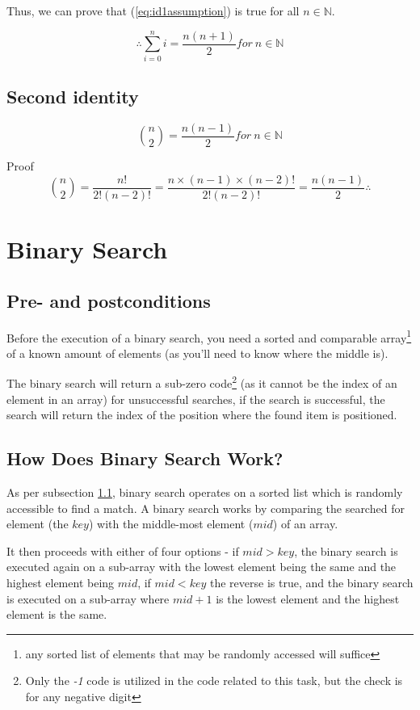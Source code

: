 \documentclass[a4paper,11pt]{article}
\begin{document}
Thus, we can prove that (\ref{eq:id1assumption}) is true for all $n \in \mathbb{N}$.

$$\therefore \sum_{i=0}^n i = \frac{n(n+1)}{2} for\ n \in \mathbb{N}$$

\subsection{Second identity}

$$\binom{n}{2} = \frac{n(n-1)}{2} for\ n \in \mathbb{N}$$

Proof
$$\binom{n}{2} = \frac{n!}{2!(n-2)!} = \frac{n \times (n-1) \times (n-2)!}{2!(n-2)!} = \frac{n(n-1)}{2} \therefore$$

\section{Binary Search}

\subsection{Pre- and postconditions}
\label{subsec:prepostcond}
Before the execution of a binary search, you need a sorted and comparable array\footnote{any sorted list of elements that may be randomly accessed will suffice} of a known amount of elements (as you'll need to know where the middle is).

The binary search will return a sub-zero code\footnote{Only the \textit{-1} code is utilized in the code related to this task, but the check is for any negative digit} (as it cannot be the index of an element in an array) for unsuccessful searches, if the search is successful, the search will return the index of the position where the found item is positioned.

\subsection{How Does Binary Search Work?}
\label{subsec:binarysearchexplanation}
As per subsection \ref{subsec:prepostcond}, binary search operates on a sorted list which is randomly accessible to find a match. A binary search works by comparing the searched for element (the $key$) with the middle-most element ($mid$) of an array.

It then proceeds with either of four options - if $mid > key$, the binary search is executed again on a sub-array with the lowest element being the same and the highest element being $mid$, if $mid < key$ the reverse is true, and the binary search is executed on a sub-array where $mid + 1$ is the lowest element and the highest element is the same.
\end{document}
